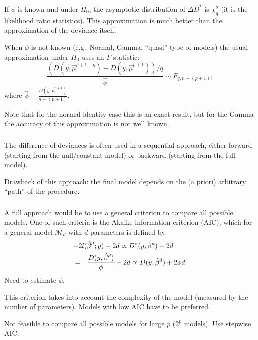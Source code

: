 \documentclass{beamer}
\newcommand{\bs}{\bigskip}
\begin{document}
\begin{frame}
\frametitle{}
If $\phi$ is known and under $H_0$, the asymptotic distribution of $\Delta D^*$ is
$\chi^2_{q}$ (it is the likelihood ratio statistics). This approximation 
is much better than the approximation of the deviance itself. 

\bs
When $\phi$ is not known (e.g.\ Normal, Gamma, ``quasi'' type of models) the
usual approximation under 
$H_0$ uses an $F$ statistic:
$$\frac{(D(y,\hat{\mu}^{p+1-q}) - D(y,\hat{\mu}^{p+1}))/q}{\hat{\phi}} \sim
F_{q,n-(p+1)},$$
where $\hat{\phi}= \frac{D(y,\hat{\mu}^{p+1})}{n-(p+1)}$. 

\bs
Note that for the normal-identity case this is an exact result, but for the
Gamma the accuracy of this approximation is not well known.
\end{frame}

\begin{frame}
\frametitle{}
The difference of deviances is often used in a sequential approach, either
forward (starting from the null/constant model) or backward (starting
from the full model).

\bs
{\color{blue}Drawback} of this approach: the final model depends on
the (a priori) arbitrary ``path'' of the procedure.
\end{frame}


\begin{frame}
\frametitle{}
A full approach would be to use a general criterion to compare all
possible models. One of such criteria is the {\color{blue}Akaike information
criterion (AIC)}, which for a general model ${\mathcal M}_{d}$ with $d$
parameters is defined by:
\begin{eqnarray*}
\lefteqn{-2 l(\hat{\beta}^d;y) + 2d  \varpropto   D^*(y,\hat{\beta}^d) + 2d} \\
& = & \frac{D(y,\hat{\beta}^d)}{\phi} + 2 d \varpropto  D(y,\hat{\beta}^d) + 2 \phi d.
\end{eqnarray*}
Need to estimate $\phi$.

\bs
This criterion takes into account the complexity of the model
(measured by the number of parameters).
Models with low AIC have to be preferred.

\bs
Not feasible to compare all possible models for large $p$ ($2^p$
models). Use stepwise AIC.
\end{frame}
\end{document}
